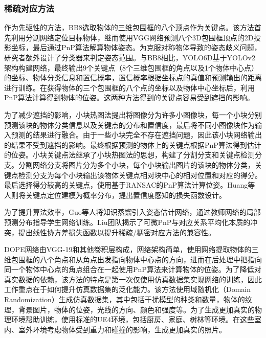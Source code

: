 \subsubsection{稀疏对应方法}\label{稀疏对应方法}
作为先驱性的方法，BB8\cite{rad2017bb8}选取物体的三维包围框的八个顶点作为关键点。该方法首先利用分割网络定位目标物体，继而使用VGG网络\cite{VGG}预测八个3D包围框顶点的2D投影坐标，最后通过PnP算法\cite{EPnP}解算物体姿态。为克服对称物体导致的姿态歧义问题，研究者额外设计了分类器来判定姿态范围。与BB8相比，YOLO6D\cite{tekin2018real}基于YOLOv2架构\cite{YOLO}构建网络，最终输出9个关键点（8个三维包围框的角点以及1个物体中心点）的坐标、物体分类信息和置信概率，置信概率根据坐标点的真值和预测输出的距离进行训练。在获得物体的三个包围框的八个点的坐标以及物体中心坐标后，利用PnP算法\cite{RANSAC}计算得到物体的位姿。这两种方法得到的关键点容易受到遮挡的影响。

为了减少遮挡的影响，小块热图法\cite{oberweger2018making}提出将图像分为许多小图像块，每一个小块分别预测该块的物体分类信息以及关键点的分布和置信度，最后将不同小图像块作为输入预测的结果进行融合。由于一些小块完全不存在遮挡问题，因此该小块网络输出的结果不受到遮挡的影响。最终根据预测的物体上的关键点根据PnP算法得到估计的位姿。小块关键点法\cite{Hu2019Segmentation}继承了小块热图法的思想，构建了分割分支和关键点检测分支。分割网络分支将图片分为多个小块，每个小块输出图片的该块的物体分类，关键点检测分支为每个小块输出该物体关键点相对块中心的相对位置和对应的得分。最后选择得分较高的关键点，使用基于RANSAC的PnP算法计算位姿。Huang等人\cite{Huang2021Confidence}则将关键点定位建模为概率分布，提出置信度感知的损失函数设计。

为了提升算法效率，Guo等人\cite{guo2023knowledge}将知识蒸馏引入姿态估计网络，通过教师网络的局部预测分布指导学生网络训练。Liu团队\cite{liu2023linear}揭示了可微PnP与对应关系平均化本质的冲突，提出线性协方差损失函数以提升稀疏/稠密对应方法的兼容性。

\par DOPE\cite{dope}网络由VGG-19\cite{VGG}和其他卷积层构成，网络架构简单，使用网络提取物体的三维包围框的八个角点和从角点出发指向物体中心点的方向，进而在后处理中把指向同一个物体中心点的角点组合在一起使用PnP算法来计算物体的位姿。为了降低对真实数据的依赖，该方法的特点是第一次仅使用仿真数据集实现网络的训练，因此工作重点在于如何提升仿真数据集的泛化能力。该方法使用域随机化（Domain Randomization）生成仿真数据集，其中包括干扰模型的种类和数量，物体的纹理，背景图片，物体的位姿，光线的方向、颜色和强度等。为了生成更加真实的物理环境帮助训练，使用标准的UE4环境，包括厨房、家庭、树林等环境。在这些室内、室外环境考虑物体受到重力和碰撞的影响，生成更加真实的照片。

